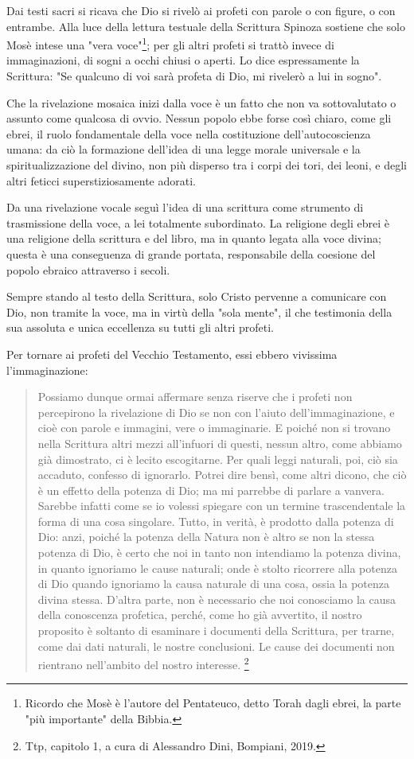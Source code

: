 Dai testi sacri si ricava che Dio si rivelò ai profeti con parole o con figure, o con entrambe. Alla luce della lettura testuale della Scrittura
Spinoza sostiene che solo Mosè intese una "vera voce"\footnote{Ricordo che Mosè è l'autore del Pentateuco, detto Torah dagli ebrei, la parte "più importante" della Bibbia.}; per gli altri profeti  si trattò invece di immaginazioni, di sogni a occhi chiusi o aperti. Lo dice espressamente
la Scrittura: "Se qualcuno di voi sarà profeta di Dio, mi rivelerò a lui in sogno". 

Che la rivelazione mosaica inizi dalla voce è un fatto che non va sottovalutato o assunto come
qualcosa di ovvio. Nessun popolo ebbe forse così chiaro, come gli ebrei, il ruolo
fondamentale della voce nella costituzione dell'autocoscienza umana: da ciò la formazione dell'idea di una legge morale universale e la spiritualizzazione
del divino, non più disperso tra i corpi dei tori, dei leoni, e degli altri feticci
superstiziosamente adorati.

Da una rivelazione vocale seguì l'idea di una scrittura come
strumento di trasmissione della voce, a lei totalmente subordinato. La religione degli ebrei è una
religione della scrittura e del libro, ma in quanto legata alla voce divina; questa è una conseguenza di grande portata, responsabile
della coesione del popolo ebraico attraverso i secoli.

Sempre stando al testo della Scrittura, solo Cristo pervenne a
comunicare con Dio, non tramite la voce, ma in virtù della "sola mente", il che
testimonia della sua assoluta e unica eccellenza su tutti gli altri profeti.

Per tornare ai profeti del Vecchio Testamento, essi ebbero vivissima l'immaginazione:

\begin{quotation}
	\small Possiamo dunque ormai affermare senza riserve che i profeti non percepirono la rivelazione di Dio
	se non con l'aiuto dell'immaginazione, e cioè con parole e immagini, vere o immaginarie. E poiché
	non si trovano nella Scrittura altri mezzi all'infuori di questi, nessun altro, come abbiamo già
	dimostrato, ci è lecito escogitarne. Per quali leggi naturali, poi, ciò sia accaduto, confesso di
	ignorarlo. Potrei dire bensì, come altri dicono, che ciò è un effetto della potenza di Dio; ma mi
	parrebbe di parlare a vanvera. Sarebbe infatti come se io volessi spiegare con un termine
	trascendentale la forma di una cosa singolare. Tutto, in verità, è prodotto dalla potenza di Dio: anzi,
	poiché la potenza della Natura non è altro se non la stessa potenza di Dio, è certo che noi in tanto non intendiamo la potenza divina, in quanto ignoriamo le cause naturali; onde è stolto ricorrere
	alla potenza di Dio quando ignoriamo la causa naturale di una cosa, ossia la potenza divina stessa.
	D'altra parte, non è necessario che noi conosciamo la causa della conoscenza profetica, perché,
	come ho già avvertito, il nostro proposito è soltanto di esaminare i documenti della Scrittura, per
	trarne, come dai dati naturali, le nostre conclusioni. Le cause dei documenti non rientrano
	nell'ambito del nostro interesse. \footnote{Ttp, capitolo 1, a cura di Alessandro Dini, Bompiani, 2019.}
\end{quotation}

